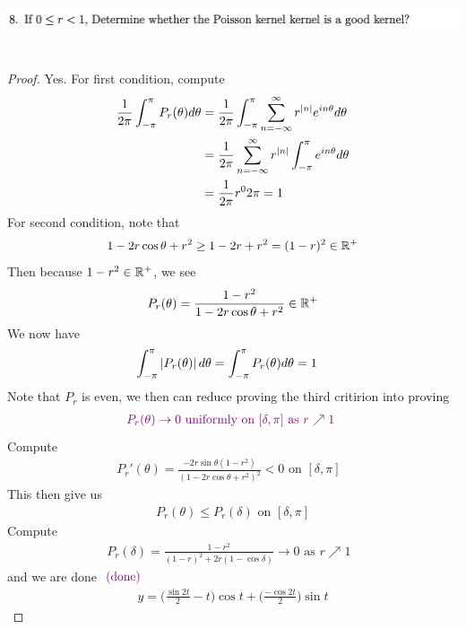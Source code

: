 \documentclass{report}
\begin{document}
\begin{question}{}{}
\includegraphics[height=2cm,width=18cm]{hw3q8}
\end{question}
\begin{proof}
Yes. For first condition, compute 
\begin{align*}
\frac{1}{2\pi}\int_{-\pi}^{\pi} P_r(\theta)d\theta &=\frac{1}{2\pi}\int_{-\pi}^{\pi}\sum_{n=-\infty}^{\infty}r^{\left|n\right|}e^{i n\theta}d\theta\\
&=\frac{1}{2\pi}\sum_{n=-\infty}^{\infty}r^{\left|n\right|}\int_{-\pi}^{\pi}e^{i n \theta}d\theta\\
&=\frac{1}{2\pi}r^0 2\pi=1
\end{align*}
For second condition, note that 
\begin{align*}
1-2r \cos \theta+r^2\geq 1-2r+r^2=(1-r)^2\in\mathbb{R}^+
\end{align*}
Then because $1-r^2\in\mathbb{R}^+$, we see 
\begin{align*}
P_r(\theta)=\frac{1-r^2}{1-2r\cos \theta+r^2}\in\mathbb{R}^+
\end{align*}
We now have 
\begin{align*}
  \int_{-\pi}^{\pi}\left|P_r(\theta)\right|d\theta &=\int_{-\pi}^{\pi}P_r(\theta)d\theta=1
\end{align*}
Note that $P_r$ is even, we then can reduce proving the third critirion into proving 
\begin{align*}
\textcolor{violet}{P_r(\theta)\to 0\text{ uniformly on $[\delta,\pi]$ as $r\nearrow 1$ }}
\end{align*}
Compute 
\begin{align*}
P_r'(\theta)=\frac{-2r \sin \theta (1-r^2)}{(1-2r \cos \theta + r^2)^2}<0\text{ on $[\delta,\pi]$ }
\end{align*}
This then give us 
\begin{align*}
P_r(\theta)\leq P_r(\delta)\text{ on }[\delta,\pi]
\end{align*}
Compute 
\begin{align*}
P_r(\delta)=\frac{1-r^2}{(1-r)^2+2r(1-\cos \delta)}\to 0\text{ as $r\nearrow 1$ }
\end{align*}
and we are done $\textcolor{violet}{\text{ (done) }}$
\begin{align*}
y=\Big(\frac{\sin 2t}{2}-t \Big)\cos t + \Big(\frac{-\cos 2t}{2} \Big)\sin t
\end{align*}
\end{proof}
\end{document}
